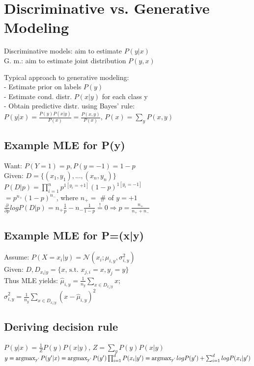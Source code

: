 \section*{Discriminative vs. Generative Modeling}
Discriminative models: aim to estimate $P(y|x)$\\
G. m.:  aim to estimate joint distribution $P(y,x)$

Typical approach to generative modeling:\\
- Estimate prior on labels $P(y)$\\
- Estimate cond. distr. $P(x|y)$ for each class y\\
- Obtain predictive distr. using Bayes' rule:\\
$P(y|x) = \frac{P(y) P(x|y)}{P(x)} = \frac{P(x,y)}{P(x)}$, $P(x) = \sum_y P(x,y)$


\subsection*{Example MLE for P(y)}
Want: $P(Y=1) = p, P(y=-1) = 1-p$\\
Given: $D=\{(x_1,y_1),...,(x_n,y_n)\}$\\
$P(D|p) = \prod_{i=1}^n p^{1[y_i=+1]} (1-p)^{1[y_i=-1]}$\\
$=p^{n_+} (1-p)^{n_-}$, where $n_+ = $ \# of $y=+1$\\
$\frac{\partial}{\partial p} log P(D|p) = n_+ \frac{1}{p} - n_- \frac{1}{1-p} \overset{!}{=} 0 \Rightarrow p=\frac{n_+}{n_+ + n_-}$

\subsection*{Example MLE for P=(x|y)}
Assume: $P(X=x_i|y) = \mathcal{N}(x_i;\mu_{i,y}, \sigma_{i,y}^2)$\\
Given: $D, D_{x_i|y} = \{x \text{, s.t. } x_{j,i}=x, y_j=y\}$\\
Thus MLE yields:
$\hat{\mu}_{i,y} = \frac{1}{n_y} \sum_{x\in D_{x_i|y}} x$;\\ %
$\hat{\sigma}_{i,y}^2 = \frac{1}{n_y} \sum_{x\in D_{x_i|y}} (x-\hat{\mu}_{i,y})^2$

\subsection*{Deriving decision rule}
$P(y|x) = \frac{1}{Z} P(y)P(x|y)$, $Z = \sum_y P(y) P(x|y)$\\
$y = \operatorname{argmax_{y'}} P(y'|x) = \operatorname{argmax_{y'}} P(y') \prod_{i=1}^d P(x_i|y')\\
= \operatorname{argmax_{y'}} log P(y') + \sum_{i=1}^d log P(x_i|y')$

